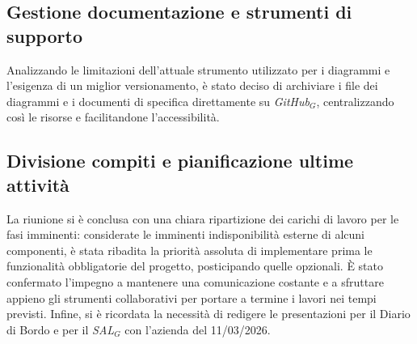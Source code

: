 \documentclass[10pt, letterpaper]{article}
\begin{document}
\subsection*{Gestione documentazione e strumenti di supporto}
Analizzando le limitazioni dell'attuale strumento utilizzato per i diagrammi e l'esigenza di un miglior
versionamento, è stato deciso di archiviare i file dei diagrammi e i documenti di specifica direttamente su \textit{GitHub$_G$},
centralizzando così le risorse e facilitandone l'accessibilità.

\subsection*{Divisione compiti e pianificazione ultime attività}
La riunione si è conclusa con una chiara ripartizione dei carichi di lavoro per le fasi imminenti:
considerate le imminenti indisponibilità esterne di alcuni componenti, è stata ribadita la priorità assoluta di implementare prima le funzionalità obbligatorie del progetto, posticipando quelle opzionali.
È stato confermato l'impegno a mantenere una comunicazione costante e a sfruttare appieno gli strumenti collaborativi per portare a termine i lavori nei tempi previsti.
Infine, si è ricordata la necessità di redigere le presentazioni per il Diario di Bordo e per il \textit{SAL$_G$} con l'azienda del 11/03/2026.

\makeDecisionTable
\end{document}
